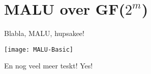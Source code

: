 
\section{MALU over GF($2^m$)}

Blabla, MALU, hupsakee!

\vspace{\textfloatsep}
\begin{minipage}{\linewidth}
    \begin{center}
    \texttt{[image: MALU-Basic]}
    \label{fig-malu-basic}
    \end{center}
    \end{minipage}
\vspace{\textfloatsep}

En nog veel meer teskt! Yes!